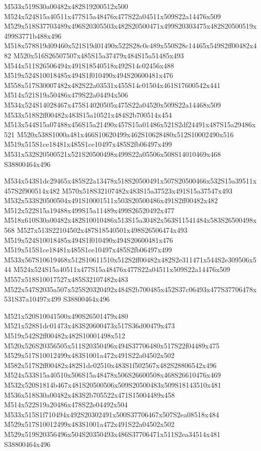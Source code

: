 \documentclass{article}
\begin{document}
\begin{multicols}{2}
M533x519S30a00482x482S19200512x500 M524x524S15a40511x477S15a48476x477S22a04511x509S22a14476x509 M529x518S37703489x496S20305503x482S20500471x499S20303475x482S20500519x499S3771b488x496 M518x578S19d09460x521S19d01490x522S28c0c489x550S28c14465x549S2ff00482x482 M520x516S26507507x485S15a37479x484S15a51485x493 M544x511S26506494x491S18540518x492S14c02456x488 M519x524S10018485x494S1f010490x494S20600481x476 M558x517S30007482x482S22a03531x455S14c01504x461S17600542x441 M514x521S19a50486x479S22a04494x506 M534x524S14028467x475S14020505x475S22a04520x509S22a14468x509 M533x518S2ff00482x483S15a10521x484S2b700514x454 M513x544S15a07488x456S15a21490x457S15a01486x521S2df24491x487S15a29486x521 M520x538S1000a481x466S10620499x462S10628480x512S10002490x516 M519x515S1ce18481x485S1ce10497x485S2fb06497x499 M531x532S20500521x521S20500498x499S22a05506x508S14010469x468 S38800464x496

M534x543S1dc29465x485S22a13478x518S20500491x507S20500466x532S15a39511x457S2f900514x482 M570x518S32107482x483S15a37523x491S15a37547x493 M532x533S20500504x491S10001511x503S20500486x491S2ff00482x482 M512x522S15a19488x499S15a11489x499S26520492x477 M518x610S30a00482x482S10010486x513S15a30482x563S11541484x583S26500498x568 M527x513S22104502x487S18540501x498S26506474x493 M519x524S10018485x494S1f010490x494S20600481x476 M519x515S1ce18481x485S1ce10497x485S2fb06497x499 M533x567S10619468x512S10611510x512S2ff00482x482S2e311471x544S2e309506x544 M524x524S15a40511x477S15a48476x477S22a04511x509S22a14476x509 M557x518S10017527x485S32107482x483 M522x547S2035a507x525S20320492x484S2b700485x452S37c06493x477S37706478x531S37a10497x499 S38800464x496

M521x520S10041500x490S26501479x480 M521x528S1dc01473x483S20600473x517S36d00479x473 M519x542S2ff00482x482S10001498x512 M520x526S20356505x511S20350496x494S37706480x517S22f04489x475 M529x517S10012499x483S1001a472x491S22a04502x502 M582x517S2ff00482x482S1dc02510x483S1f502567x482S28806542x496 M524x533S15a40510x506S15a48478x506S26600508x468S26610476x469 M532x520S1814b467x481S20500506x509S20500483x509S18143510x481 M536x518S30a00482x483S2b705522x471S15004489x458 M514x522S19a20486x478S22e04492x504 M533x515S1f710494x492S20302491x500S37706467x507S2ea08518x484 M529x517S10012499x483S1001a472x491S22a04502x502 M529x519S20356496x504S20350493x486S37706471x511S2ea34514x481 S38800464x496


\end{multicols}
\end{document}
